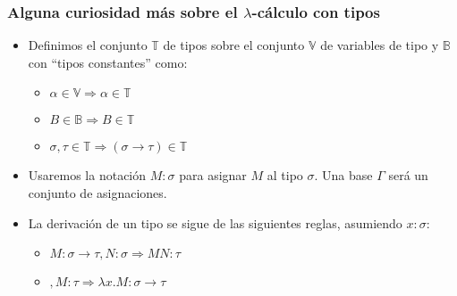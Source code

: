 \documentclass[spanish, a4paper, 12pt, final, slideColor, nototal, colorBG, pdf, noaccumulate, darkblue] {beamer}
\begin{document}
\begin{frame}
    \frametitle{Alguna curiosidad más sobre el $\lambda$-cálculo con tipos}
    \begin{itemize}


    \item Definimos el conjunto $\mathbb{T}$ de tipos sobre el conjunto $\mathbb{V}$ de variables de tipo y $\mathbb{B}$ con ``tipos constantes'' como:
    \begin{itemize}
        \item $\alpha \in \mathbb{V} \Rightarrow \alpha \in \mathbb{T}$
        \item $B \in \mathbb{B} \Rightarrow B \in \mathbb{T}$
        \item $\sigma, \tau \in \mathbb{T} \Rightarrow (\sigma \rightarrow \tau) \in \mathbb{T}$
    \end{itemize}
    \item Usaremos la notación $M:\sigma$ para asignar $M$ al tipo $\sigma$. Una base $\Gamma$ será un conjunto de asignaciones.
    \item La derivación de un tipo se sigue de las siguientes reglas, asumiendo $x:\sigma$:
    \begin{itemize}
        \item $M:\sigma \rightarrow \tau, N:\sigma \Rightarrow MN:\tau$
        \item {}$, M:\tau \Rightarrow \lambda x.M:\sigma \rightarrow \tau$
    \end{itemize}
    \end{itemize}
\end{frame}
\end{document}
